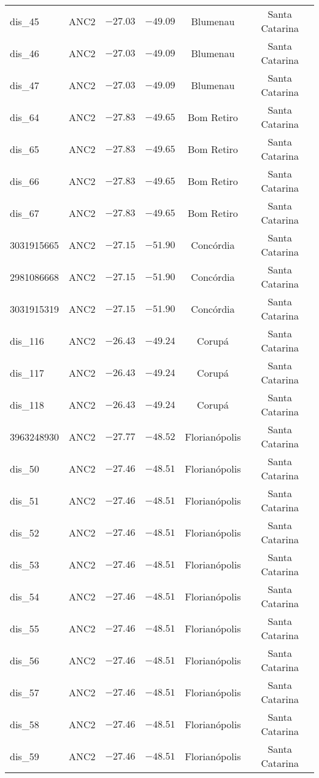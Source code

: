 \begin{longtable}{lccccc}
dis\_45 & ANC2 & $-27.03$ & $-49.09$ & Blumenau & Santa Catarina \\ 
dis\_46 & ANC2 & $-27.03$ & $-49.09$ & Blumenau & Santa Catarina \\ 
dis\_47 & ANC2 & $-27.03$ & $-49.09$ & Blumenau & Santa Catarina \\ 
dis\_64 & ANC2 & $-27.83$ & $-49.65$ & Bom Retiro & Santa Catarina \\ 
dis\_65 & ANC2 & $-27.83$ & $-49.65$ & Bom Retiro & Santa Catarina \\ 
dis\_66 & ANC2 & $-27.83$ & $-49.65$ & Bom Retiro & Santa Catarina \\ 
dis\_67 & ANC2 & $-27.83$ & $-49.65$ & Bom Retiro & Santa Catarina \\ 
3031915665 & ANC2 & $-27.15$ & $-51.90$ & Concórdia & Santa Catarina \\ 
2981086668 & ANC2 & $-27.15$ & $-51.90$ & Concórdia & Santa Catarina \\ 
3031915319 & ANC2 & $-27.15$ & $-51.90$ & Concórdia & Santa Catarina \\ 
dis\_116 & ANC2 & $-26.43$ & $-49.24$ & Corupá & Santa Catarina \\ 
dis\_117 & ANC2 & $-26.43$ & $-49.24$ & Corupá & Santa Catarina \\ 
dis\_118 & ANC2 & $-26.43$ & $-49.24$ & Corupá & Santa Catarina \\ 
3963248930 & ANC2 & $-27.77$ & $-48.52$ & Florianópolis & Santa Catarina \\ 
dis\_50 & ANC2 & $-27.46$ & $-48.51$ & Florianópolis & Santa Catarina \\ 
dis\_51 & ANC2 & $-27.46$ & $-48.51$ & Florianópolis & Santa Catarina \\ 
dis\_52 & ANC2 & $-27.46$ & $-48.51$ & Florianópolis & Santa Catarina \\ 
dis\_53 & ANC2 & $-27.46$ & $-48.51$ & Florianópolis & Santa Catarina \\ 
dis\_54 & ANC2 & $-27.46$ & $-48.51$ & Florianópolis & Santa Catarina \\ 
dis\_55 & ANC2 & $-27.46$ & $-48.51$ & Florianópolis & Santa Catarina \\ 
dis\_56 & ANC2 & $-27.46$ & $-48.51$ & Florianópolis & Santa Catarina \\ 
dis\_57 & ANC2 & $-27.46$ & $-48.51$ & Florianópolis & Santa Catarina \\ 
dis\_58 & ANC2 & $-27.46$ & $-48.51$ & Florianópolis & Santa Catarina \\ 
dis\_59 & ANC2 & $-27.46$ & $-48.51$ & Florianópolis & Santa Catarina \\ 

\end{longtable}
